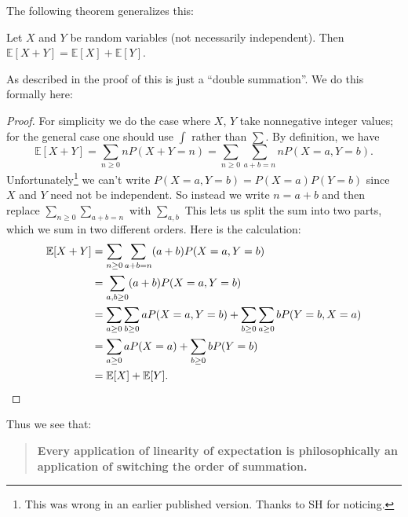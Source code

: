 \documentclass[11pt]{scrartcl}
\newcommand{\EE}{\mathbb E}
\begin{document}
The following theorem generalizes this:
\begin{example}
  Let $X$ and $Y$ be random variables
  (not necessarily independent).
  Then $\EE[X+Y] = \EE[X] + \EE[Y]$.
\end{example}
As described in \cite{ref:EV} the proof
of this is just a ``double summation''.
We do this formally here:
\begin{proof}
  For simplicity we do the case where $X$, $Y$ take
  nonnegative integer values; for the general case one should use $\int$
  rather than $\sum$.
  By definition, we have
  \[
    \EE[X+Y] = \sum_{n \ge 0} n P(X+Y=n)
    = \sum_{n \ge 0} \sum_{a+b=n} n P(X=a,Y=b).
  \]
  Unfortunately\footnote{%
    This was wrong in an earlier published version.
    Thanks to SH for noticing.}
  we can't write $P(X=a,Y=b) = P(X=a)P(Y=b)$ since
  $X$ and $Y$ need not be independent.
  So instead we write $n=a+b$ and then replace
  $\sum_{n \ge 0} \sum_{a+b=n}$ with $\sum_{a,b}$
  This lets us split the sum into two parts,
  which we sum in two different orders.
  Here is the calculation:
  \begin{align*}
    \EE[X+Y] &= \sum_{n \ge 0} \sum_{a+b=n} (a+b)P(X=a,Y=b) \\
    &= \sum_{a,b \ge 0} (a+b) P(X=a, Y=b) \\
    &= \sum_{a \ge 0} \sum_{b \ge 0} a P(X=a, Y=b)
    + \sum_{b \ge 0} \sum_{a \ge 0} b P(Y=b, X=a) \\
    &= \sum_{a \ge 0} a P(X=a) + \sum_{b \ge 0} b P(Y=b) \\
    &= \EE[X] + \EE[Y]. \qedhere
  \end{align*}
\end{proof}
Thus we see that:
\begin{quote}
  \bfseries Every application of linearity of expectation is philosophically an application of switching the order of summation.
\end{quote}
\end{document}
